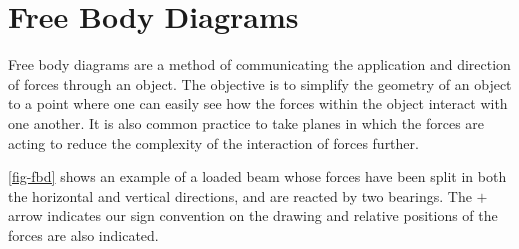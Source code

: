 \section{Free Body Diagrams}

Free body diagrams are a method of communicating the application and direction of forces through an object. The objective is to simplify the geometry of an object to a point where one can easily see how the forces within the object interact with one another. It is also common practice to take planes in which the forces are acting to reduce the complexity of the interaction of forces further.

\cref{fig-fbd} shows an example of a loaded beam whose forces have been split in both the horizontal and vertical directions, and are reacted by two bearings. The $+$ arrow indicates our sign convention on the drawing and relative positions of the forces are also indicated.

